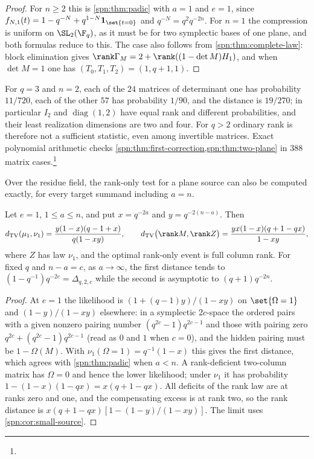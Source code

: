 \begin{proof}
For $n\ge2$ this is \cref{spn:thm:padic} with $a=1$ and $e=1$, since
$f_{N,1}(t)=1-q^{-N}+q^{1-N}\mathbf 1_{\set{t=0}}$ and $q^{-N}=q^2q^{-2n}$. For $n=1$ the
compression is uniform on $\SL_2(\F_q)$, as it must be for two symplectic bases of one plane, and
both formulas reduce to this. The case also follows from \cref{spn:thm:complete-law}: block
elimination gives $\rank\Gamma_M=2+\rank((1-\det M)H_1)$, and when $\det M=1$ one has
$(T_0,T_1,T_2)=(1,q+1,1)$.
\end{proof}

For $q=3$ and $n=2$, each of the $24$ matrices of determinant one has probability $11/720$, each
of the other $57$ has probability $1/90$, and the distance is $19/270$; in particular $I_2$ and
$\operatorname{diag}(1,2)$ have equal rank and different probabilities, and their least
realization dimensions are two and four. For $q>2$ ordinary rank is therefore not a sufficient
statistic, even among invertible matrices. Exact polynomial arithmetic checks
\cref{spn:thm:first-correction,spn:thm:two-plane} in $388$ matrix
cases.\footnote{}

Over the residue field, the rank-only test for a plane source can also be computed exactly, for
every target summand including $a=n$.

\begin{proposition}\label{spn:prop:plane-rank}
Let $e=1$, $1\le a\le n$, and put $x=q^{-2a}$ and $y=q^{-2(n-a)}$. Then
\[
 \spnTV(\mu_1,\nu_1)=\frac{y(1-x)(q-1+x)}{q(1-xy)},\qquad
 \spnTV\bigl(\rank M,\rank Z\bigr)=\frac{yx(1-x)(q+1-qx)}{1-xy},
\]
where $Z$ has law $\nu_1$, and the optimal rank-only event is full column rank. For fixed $q$ and
$n-a=c$, as $a\to\infty$, the first distance tends to $(1-q^{-1})q^{-2c}=\Delta_{q,2,c}$ while the
second is asymptotic to $(q+1)q^{-2n}$.
\end{proposition}

\begin{proof}
At $e=1$ the likelihood is $(1+(q-1)y)/(1-xy)$ on $\set{\Omega=1}$ and $(1-y)/(1-xy)$ elsewhere:
in a symplectic $2c$-space the ordered pairs with a given nonzero pairing number
$(q^{2c}-1)q^{2c-1}$ and those with pairing zero $q^{2c}+(q^{2c}-1)q^{2c-1}$ (read as $0$ and $1$
when $c=0$), and the hidden pairing must be $1-\Omega(M)$. With $\nu_1(\Omega=1)=q^{-1}(1-x)$ this
gives the first distance, which agrees with \cref{spn:thm:padic} when $a<n$. A rank-deficient
two-column matrix has $\Omega=0$ and hence the lower likelihood; under $\nu_1$ it has probability
$1-(1-x)(1-qx)=x(q+1-qx)$. All deficits of the rank law are at ranks zero and one, and the
compensating excess is at rank two, so the rank distance is $x(q+1-qx)[1-(1-y)/(1-xy)]$. The limit
uses \cref{spn:cor:small-source}.
\end{proof}

